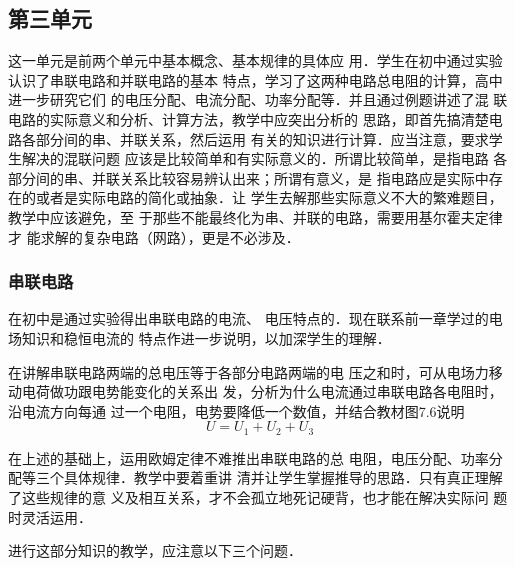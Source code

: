 \subsection{第三单元}
这一单元是前两个单元中基本概念、基本规律的具体应
用．学生在初中通过实验认识了串联电路和并联电路的基本
特点，学习了这两种电路总电阻的计算，高中进一步研究它们
的电压分配、电流分配、功率分配等．并且通过例题讲述了混
联电路的实际意义和分析、计算方法，教学中应突出分析的
思路，即首先搞清楚电路各部分间的串、并联关系，然后运用
有关的知识进行计算．应当注意，要求学生解决的混联问题
应该是比较简单和有实际意义的．所谓比较简单，是指电路
各部分间的串、并联关系比较容易辨认出来；所谓有意义，是
指电路应是实际中存在的或者是实际电路的简化或抽象．让
学生去解那些实际意义不大的繁难题目，教学中应该避免，至
于那些不能最终化为串、并联的电路，需要用基尔霍夫定律才
能求解的复杂电路（网路），更是不必涉及．

\subsubsection{串联电路}

在初中是通过实验得出串联电路的电流、
电压特点的．现在联系前一章学过的电场知识和稳恒电流的
特点作进一步说明，以加深学生的理解．

在讲解串联电路两端的总电压等于各部分电路两端的电
压之和时，可从电场力移动电荷做功跟电势能变化的关系出
发，分析为什么电流通过串联电路各电阻时，沿电流方向每通
过一个电阻，电势要降低一个数值，并结合教材图7.6说明
\[U=U_1+U_2+U_3\]

在上述的基础上，运用欧姆定律不难推出串联电路的总
电阻，电压分配、功率分配等三个具体规律．教学中要着重讲
清并让学生掌握推导的思路．只有真正理解了这些规律的意
义及相互关系，才不会孤立地死记硬背，也才能在解决实际问
题时灵活运用．

进行这部分知识的教学，应注意以下三个问题．

